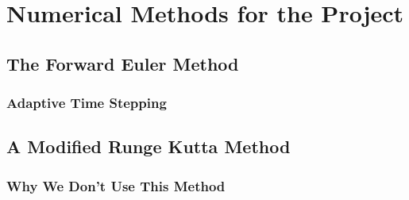\chapter{Numerical Methods for the Project}
\section{The Forward Euler Method}
\subsection*{Adaptive Time Stepping}
\section{A  Modified Runge Kutta Method}
\subsection*{Why We Don't Use This Method}
